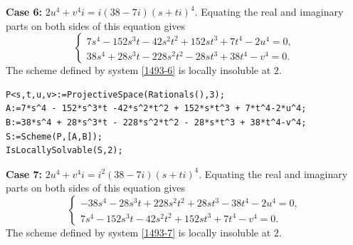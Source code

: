 \documentclass[a4paper,12pt,english,reqno]{amsart}
\begin{document}
{\bf Case 6:} $2u^4+v^4i=i(38-7i)(s+ti)^4$. Equating the real and imaginary parts on both sides of this equation gives
\begin{equation}\label{1493-6}
\begin{cases}
7s^4 - 152s^3t - 42s^2t^2 + 152st^3 + 7t^4 - 2u^4=0,\\
38s^4 + 28s^3t - 228s^2t^2 - 28st^3 + 38t^4 - v^4=0.
\end{cases}
\end{equation}
The scheme defined by system \eqref{1493-6} is locally insoluble at $2$.
%

\begin{lstlisting}
P<s,t,u,v>:=ProjectiveSpace(Rationals(),3);
A:=7*s^4 - 152*s^3*t -42*s^2*t^2 + 152*s*t^3 + 7*t^4-2*u^4;
B:=38*s^4 + 28*s^3*t - 228*s^2*t^2 - 28*s*t^3 + 38*t^4-v^4;
S:=Scheme(P,[A,B]);
IsLocallySolvable(S,2);
\end{lstlisting}

{\bf Case 7:} $2u^4+v^4i=i^2(38-7i)(s+ti)^4$. Equating the real and imaginary parts on both sides of this equation gives
\begin{equation}\label{1493-7}
\begin{cases}
-38s^4 - 28s^3t + 228s^2t^2 + 28st^3 - 38t^4 - 2u^4=0,\\
7s^4 - 152s^3t - 42s^2t^2 + 152st^3 + 7t^4 - v^4=0.
\end{cases}
\end{equation}
The scheme defined by system \eqref{1493-7} is locally insoluble at $2$.

\end{document}
